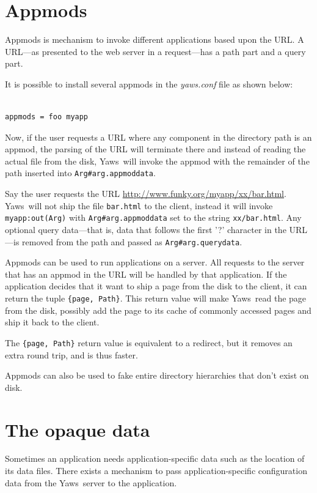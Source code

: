 \documentclass[11pt,oneside,english]{book}
\newcommand{\Yaws}            %
        {{\sc Yaws}}
\begin{document}
\section{Appmods}
\label{appmods}

Appmods is mechanism to invoke different applications based upon the
URL. A URL---as presented to the web server in a request---has a path
part and a query part.

It is possible to install several appmods in the \textit{yaws.conf}
file as shown below:

\begin{verbatim}

appmods = foo myapp

\end{verbatim}

Now, if the user requests a URL where any component in the
directory path is an appmod, the parsing of the URL will terminate
there and instead of reading the actual file from the disk, \Yaws\  will
invoke the appmod with the remainder of the path inserted into
\verb+Arg#arg.appmoddata+.

Say the user requests the URL
\url{http://www.funky.org/myapp/xx/bar.html}.  \Yaws\ will not ship
the file \verb+bar.html+ to the client, instead it will invoke
\verb+myapp:out(Arg)+ with \verb+Arg#arg.appmoddata+ set to the string
\verb+xx/bar.html+. Any optional query data---that is, data that
follows the first '?' character in the URL---is removed from the path
and passed as \verb+Arg#arg.querydata+.

Appmods can be used to run applications on a server. All requests
to the server that has an appmod in the URL will be handled by that
application. If the application decides that it want to
ship a page from the disk to the client, it can return the
tuple \verb+{page, Path}+. This return value will make \Yaws\  read
the page from the disk, possibly add the page to its cache of
commonly accessed pages and ship it back to the client.

The \verb+{page, Path}+ return value is equivalent to a
redirect, but it removes an extra round trip, and is thus faster.

Appmods can also be used to fake entire directory hierarchies
that don't exist on disk.


\section{The opaque data}

Sometimes an application needs application-specific data such as the
location of its data files. There exists a mechanism to pass
application-specific configuration data from the \Yaws\ server to the
application.
\end{document}
